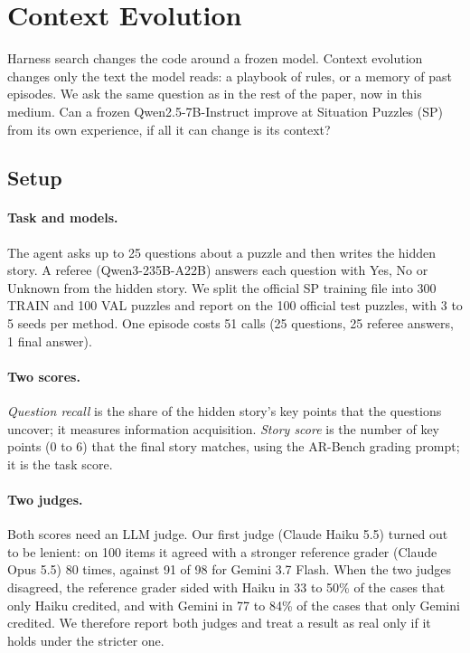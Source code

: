 
\section{Context Evolution}
\label{sec:context}

Harness search changes the code around a frozen model. Context evolution changes only the text the model reads:
a playbook of rules, or a memory of past episodes. We ask the same question as in the rest of the paper, now in this
medium. Can a frozen Qwen2.5-7B-Instruct improve at Situation Puzzles (SP) from its own experience, if all it can change
is its context?

\subsection{Setup}

\paragraph{Task and models.} The agent asks up to 25 questions about a puzzle and then writes the hidden story. A
referee (Qwen3-235B-A22B) answers each question with Yes, No or Unknown from the hidden story. We split the official
SP training file into 300 TRAIN and 100 VAL puzzles and report on the 100 official test puzzles, with 3 to 5 seeds per
method. One episode costs 51 calls (25 questions, 25 referee answers, 1 final answer).

\paragraph{Two scores.} \emph{Question recall} is the share of the hidden story's key points that the questions
uncover; it measures information acquisition. \emph{Story score} is the number of key points (0 to 6) that the final
story matches, using the AR-Bench grading prompt; it is the task score.

\paragraph{Two judges.} Both scores need an LLM judge. Our first judge (Claude Haiku 5.5) turned out to be lenient:
on 100 items it agreed with a stronger reference grader (Claude Opus 5.5) 80 times, against 91 of 98 for Gemini 3.7
Flash. When the two judges disagreed, the reference grader sided with Haiku in 33 to 50\% of the cases that only Haiku
credited, and with Gemini in 77 to 84\% of the cases that only Gemini credited. We therefore report both judges and
treat a result as real only if it holds under the stricter one.

